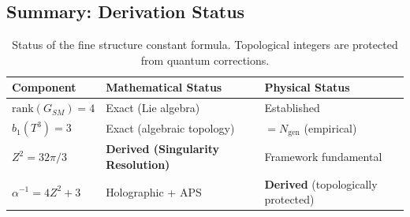 \documentclass[12pt,a4paper]{article}
\newcommand{\Zsq}{Z^2}
\newcommand{\Ngen}{N_{\text{gen}}}
\begin{document}
\subsection{Summary: Derivation Status}

\begin{table}[H]
\centering
\begin{tabular}{lll}
\toprule
\textbf{Component} & \textbf{Mathematical Status} & \textbf{Physical Status} \\
\midrule
$\text{rank}(G_{SM}) = 4$ & Exact (Lie algebra) & Established \\
$b_1(T^3) = 3$ & Exact (algebraic topology) & $= \Ngen$ (empirical) \\
$\Zsq = 32\pi/3$ & \textbf{Derived (Singularity Resolution)} & Framework fundamental \\
$\alpha^{-1} = 4\Zsq + 3$ & Holographic + APS & \textbf{Derived} (topologically protected) \\
\bottomrule
\end{tabular}
\caption{Status of the fine structure constant formula. Topological integers are protected from quantum corrections.}
\end{table}
\end{document}
